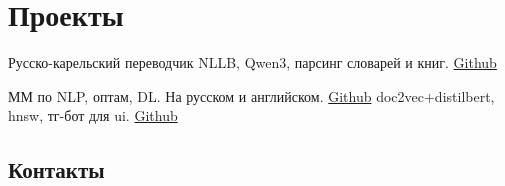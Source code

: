 \documentclass[12pt,a4paper,sans]{moderncv}
\begin{document}
\section{Проекты}
\cvline
{Русско-карельский переводчик}
{NLLB, Qwen3, парсинг словарей и книг. \href{https://github.com/breadfan/kielven_project}{Github}
	}

  {ММ по NLP, оптам, DL. На русском и английском. \href{https://github.com/breadfan/mindmaps-for-everything}{Github}
  }
  {doc2vec+distilbert, hnsw, тг-бот для ui. \href{https://github.com/breadfan/lyrics-based-songs-recommender}{Github}
}
 

  
  	
  






 \subsection{Контакты}
\end{document}
